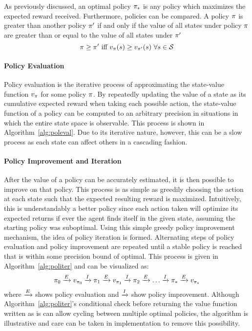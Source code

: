 As previously discussed,
an optimal policy $\pi_*$ is any policy which maximizes the expected reward
received.
%
Furthermore, policies can be compared.
%
A policy $\pi$ is greater than another policy $\pi'$
if and only if the value of all states under policy $\pi$
are greater than or equal to the value of all states under $\pi'$
\[
\policy \ge \policy'\ 
	\text{iff}\ 
	v_\policy(s) \ge v_{\policy'}(s)\ \forall s\in\States
\]


\paragraph*{Policy Evaluation}


Policy evaluation is the iterative process of approximating the state-value
function $v_\pi$ for some policy $\pi$.
%
By repeatedly updating the value of a state
as its cumulative expected reward when taking each possible action,
the state-value function of a policy can be computed to an
arbitrary precision
in situations in which the entire state space is observable.
%
This process is shown in Algorithm~\ref{alg:poleval}.
%
Due to its iterative nature,
however,
this can be a slow process
as each state can affect others in a cascading fashion.



\paragraph*{Policy Improvement and Iteration}



After the value of a policy can be accurately estimated,
it is then possible to improve on that policy.
% 
This process is as simple as greedily choosing the action at each state such
that the expected resulting reward is maximized.
%
Intuitively,
this is understandably a better policy
since each action taken will optimize its expected returns if ever the
agent finds itself in the given state,
assuming the starting policy was suboptimal.
%
Using this simple greedy policy improvement mechanism,
the idea of policy iteration is formed.
%
Alternating steps of policy evaluation and policy improvement are repeated
until a stable policy is reached that is within some precision bound of  optimal.
%
This process is given in Algorithm~\ref{alg:politer}
and can be visualized as:
\[
	\pi_0 \xrightarrow{E} v_{\pi_0} \xrightarrow{I}
	\pi_1 \xrightarrow{E} v_{\pi_1} \xrightarrow{I}
	\pi_2 \xrightarrow{E} \ldots \xrightarrow{I}
	\pi_* \xrightarrow{E} v_{\pi_*}
\]
where $\xrightarrow{E}$ shows policy evaluation and $\xrightarrow{I}$ show policy improvement.
%
Although Algorithm~\ref{alg:politer}'s conditional check before
returning the value function written as is
can allow cycling between multiple optimal
policies,
the algorithm is illustrative
and care can be taken in implementation to remove this possibility.

